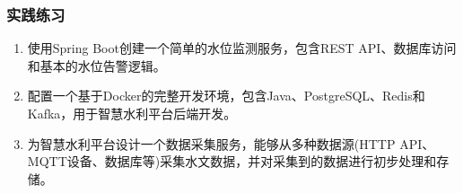 \subsubsection{实践练习}\label{ux5b9eux8df5ux7ec3ux4e60}

\begin{enumerate}
\def\labelenumi{\arabic{enumi}.}
\item
  使用Spring Boot创建一个简单的水位监测服务，包含REST
  API、数据库访问和基本的水位告警逻辑。
\item
  配置一个基于Docker的完整开发环境，包含Java、PostgreSQL、Redis和Kafka，用于智慧水利平台后端开发。
\item
  为智慧水利平台设计一个数据采集服务，能够从多种数据源(HTTP
  API、MQTT设备、数据库等)采集水文数据，并对采集到的数据进行初步处理和存储。
\end{enumerate}
